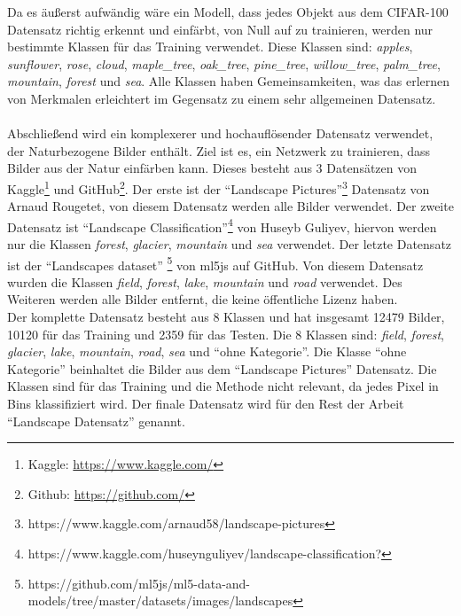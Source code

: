 Da es äußerst aufwändig wäre ein Modell, dass jedes Objekt aus dem CIFAR-100 Datensatz richtig erkennt und einfärbt,
von Null auf zu trainieren, werden
nur bestimmte Klassen für das Training verwendet. Diese Klassen sind: \textit{apples}, \textit{sunflower}, \textit{rose}, \textit{cloud},
\textit{maple\_tree}, \textit{oak\_tree}, \textit{pine\_tree}, \textit{willow\_tree}, \textit{palm\_tree},
\textit{mountain}, \textit{forest} und \textit{sea}.
Alle Klassen haben Gemeinsamkeiten, was das erlernen von Merkmalen erleichtert im Gegensatz zu einem sehr allgemeinen Datensatz.
\\
\\
Abschließend wird ein komplexerer und hochauflösender Datensatz verwendet, der Naturbezogene Bilder enthält. Ziel ist es, ein Netzwerk zu
trainieren, dass Bilder aus der Natur einfärben kann. Dieses besteht aus 3 Datensätzen von
Kaggle\footnote{Kaggle: \url{https://www.kaggle.com/}} und GitHub\footnote{Github: \url{https://github.com/}}.
Der erste ist der ``Landscape Pictures''\footnote{https://www.kaggle.com/arnaud58/landscape-pictures} Datensatz von Arnaud Rougetet, von diesem
Datensatz werden alle Bilder verwendet. Der zweite Datensatz ist
``Landscape Classification''\footnote{https://www.kaggle.com/huseynguliyev/landscape-classification?} von Huseyb Guliyev, hiervon werden nur
die Klassen \textit{forest}, \textit{glacier}, \textit{mountain} und \textit{sea} verwendet. Der letzte Datensatz ist der ``Landscapes dataset''
\footnote{https://github.com/ml5js/ml5-data-and-models/tree/master/datasets/images/landscapes} von ml5js auf GitHub. Von diesem Datensatz wurden
die Klassen \textit{field}, \textit{forest}, \textit{lake}, \textit{mountain} und \textit{road} verwendet. Des Weiteren werden alle Bilder entfernt,
die keine öffentliche Lizenz haben.
\\
Der komplette Datensatz besteht aus 8 Klassen und hat insgesamt
12479 Bilder, 10120 für das Training und 2359 für das Testen. Die 8 Klassen sind: \textit{field}, \textit{forest}, \textit{glacier},
\textit{lake}, \textit{mountain}, \textit{road}, \textit{sea} und ``ohne Kategorie''.
Die Klasse ``ohne Kategorie'' beinhaltet die Bilder aus dem ``Landscape Pictures'' Datensatz. Die Klassen sind für das Training und
die Methode nicht relevant, da jedes Pixel in Bins klassifiziert wird. Der finale Datensatz wird für den Rest der
Arbeit ``Landscape Datensatz'' genannt.

